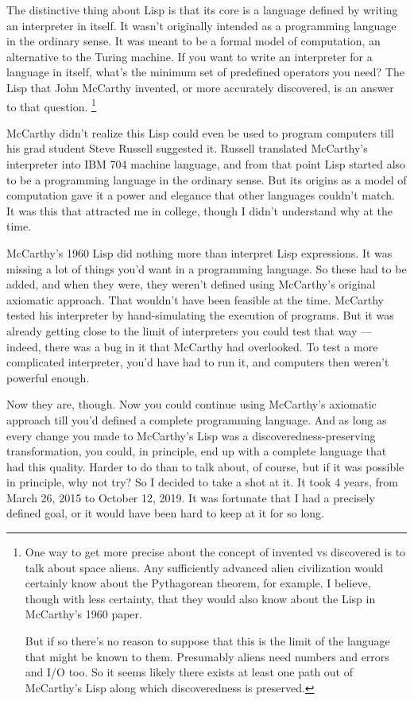 \documentclass[12pt]{book}
\begin{document}
The distinctive thing about Lisp is that its core is a language defined
by writing an interpreter in itself. It wasn't originally intended as a
programming language in the ordinary sense. It was meant to be a formal
model of computation, an alternative to the Turing machine. If you want
to write an interpreter for a language in itself, what's the minimum set
of predefined operators you need? The Lisp that John McCarthy invented,
or more accurately discovered, is an answer to that question.
\footnote{One way to get more precise about the concept of invented vs
discovered is to talk about space aliens. Any sufficiently advanced
alien civilization would certainly know about the Pythagorean theorem,
for example. I believe, though with less certainty, that they would also
know about the Lisp in McCarthy's 1960 paper.

But if so there's no reason to suppose that this is the limit of the
language that might be known to them. Presumably aliens need numbers and
errors and I/O too. So it seems likely there exists at least one path
out of McCarthy's Lisp along which discoveredness is preserved.}

McCarthy didn't realize this Lisp could even be used to program
computers till his grad student Steve Russell suggested it. Russell
translated McCarthy's interpreter into IBM 704 machine language, and
from that point Lisp started also to be a programming language in the
ordinary sense. But its origins as a model of computation gave it a
power and elegance that other languages couldn't match. It was this that
attracted me in college, though I didn't understand why at the time.

McCarthy's 1960 Lisp did nothing more than interpret Lisp expressions.
It was missing a lot of things you'd want in a programming language. So
these had to be added, and when they were, they weren't defined using
McCarthy's original axiomatic approach. That wouldn't have been feasible
at the time. McCarthy tested his interpreter by hand-simulating the
execution of programs. But it was already getting close to the limit of
interpreters you could test that way --- indeed, there was a bug in it
that McCarthy had overlooked. To test a more complicated interpreter,
you'd have had to run it, and computers then weren't powerful enough.

Now they are, though. Now you could continue using McCarthy's axiomatic
approach till you'd defined a complete programming language. And as long
as every change you made to McCarthy's Lisp was a
discoveredness-preserving transformation, you could, in principle, end
up with a complete language that had this quality. Harder to do than to
talk about, of course, but if it was possible in principle, why not try?
So I decided to take a shot at it. It took 4 years, from March 26, 2015
to October 12, 2019. It was fortunate that I had a precisely defined
goal, or it would have been hard to keep at it for so long.
\end{document}
